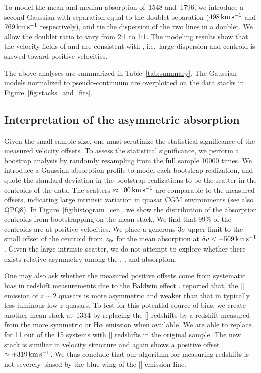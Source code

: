 \documentclass[iop]{emulateapj}
\begin{document}
To model the mean and median absorption of \,1548 and \,1796, we introduce a  
second Gaussian with separation equal to the doublet separation ($498\,{\rm km\,s^{-1}}$ and 
$769\,{\rm km\,s^{-1}}$ respectively), and tie the dispersion of the two lines in a doublet. We
allow the doublet ratio to vary from 2:1 to 1:1. The modeling results show that the velocity fields
of  and  are consistent with , i.e.\ large dispersion and centroid
is skewed toward positive velocities.

The above analyses are summarized in Table~\ref{tab:summary}. The Gaussian models normalized to 
pseudo-continuum are overplotted on the data stacks in Figure~\ref{fig:stacks_and_fits}. 

%


\subsection{Interpretation of the asymmetric absorption}
\label{sec:significance_+ve}

Given the small sample size, one must scrutinize the statistical significance of the measured 
velocity offsets. To assess the statistical significance, we perform a boostrap analysis by 
randomly resampling from the full sample 10000 times. We introduce a Gaussian absorption profile 
to model each bootstrap realization, and quote the standard deviation in the bootstrap 
realizations to be the scatter in the centroids of the data. The scatters 
$\approx100\,{\rm km\,s^{-1}}$ are comparable to the measured offsets, indicating large intrinsic 
variation in quasar CGM environments (see also QPQ8). In Figure~\ref{fig:histogram_cen}, we show 
the distribution of the absorption centroids from bootstrapping on the  mean stack. We 
find that 99\% of the centroids are at positive velocities. We place a generous $3\sigma$ upper 
limit to the small offset of the centroid from $z_{\rm fg}$ for the  mean absorption at 
$\delta v<+509\,{\rm km\,s^{-1}}$. Given the large intrinsic scatter, we do not attempt to explore
whether there exists relative asymmetry among the , , and  
absorption. 

One may also ask whether the measured positive offsets come from systematic bias in redshift 
measurements due to the Baldwin effect \citep{Baldwin77}. \cite{Shen16} reported that, the 
[] emission of $z\sim2$ quasars is more asymmetric and weaker than that in typically 
less luminous low-$z$ quasars. To test for this potential source of bias, we create another mean 
stack at \,1334 by replacing the [] redshifts by a redshift measured from the
more symmetric  or H$\alpha$ emission when available. We are able to replace for 11 out
of the 15 systems with [] redshifts in the original sample. The new stack is similiar in
velocity structure and again shows a positive offset $\approx+319\,{\rm km\,s^{-1}}$. We thus
conclude that our algorithm for measuring redshifts is not severely biased by the blue wing of the
[] emission-line.
\end{document}
